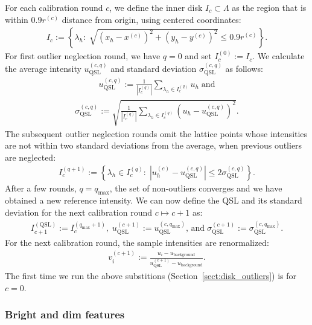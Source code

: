 \documentclass{aa}
\newcommand{\eqnl}[2]{\begin{eqnarray}\label{#1}#2\end{eqnarray}}
\newcommand{\s}[2]{{#1}_{\mathrm{#2}}}
\begin{document}
  For each calibration round $c$, we define the inner disk $I_c \subset \Lambda$ as the region that is within $0.9 r^{(c)}$ distance from origin, using centered coordinates:
  \eqnl{calib_inner_disk1}{
  I_c := \left\{ \lambda_h :\; \sqrt{\left( x_h - x^{(c)} \right)^2 + \left( y_h - y^{(c)} \right)^2} \le 0.9 r^{(c)} \right\} \text{.}
  }  
  For first outlier neglection round, we have $q=0$ and set $I_{c}^{(0)} := I_c$. We calculate the average intensity $\s{u}{QSL}^{(c,q)}$ and standard deviation $\s{\sigma}{QSL}^{(c,q)}$ as follows:
  \eqnl{calib_inner_disk2}{
  \s{u}{QSL}^{(c,q)} := \frac{1}{|I_{c}^{(q)}|} \sum \limits_{\lambda_h \in I_{c}^{(q)}} u_h \; \text{and}
  }
  \eqnl{calib_inner_disk3}{
  \s{\sigma}{QSL}^{(c,q)} := \sqrt{\frac{1}{|I_{c}^{(q)}|} \sum \limits_{\lambda_h \in I_{c}^{(q)}} \left( u_h - \s{u}{QSL}^{(c,q)} \right)^2} \text{.}
  }
  The subsequent outlier neglection rounds omit the lattice points whose intensities are not within two standard deviations from the average, when previous outliers are neglected:
  \eqnl{calib_inner_disk4}{
  I_c^{(q+1)} := \left\{ \lambda_h \in I_c^{(q)} :\; \left|u_h^{(c)} - \s{u}{QSL}^{(c,q)} \right| \le 2 \s{\sigma}{QSL}^{(c,q)} \right\} \text{.}
  }
  After a few rounds, $q = \s{q}{max}$, the set of non-outliers converges and we have obtained a new reference 
  intensity. We can now define the QSL and its standard deviation for the next calibration round $c \mapsto c+1$ as:
  \eqnl{calib_inner_disk5}{
  I_{c+1}^{(\mathrm{QSL})} := I_{c}^{(\s{q}{max}+1)},\; \s{u}{QSL}^{(c+1)} := \s{u}{QSL}^{(c,\s{q}{max})} \text{, and} \; \s{\sigma}{QSL}^{(c+1)} := \s{\sigma}{QSL}^{(c,\s{q}{max})} \text{.}
  }
  For the next calibration round, the sample intensities are renormalized:
  \eqnl{calib_inner_disk6}{
  v_i^{(c+1)} := \frac{u_i - \s{u}{background}}{\s{u}{QSL}^{(c+1)} - \s{u}{background}} \text{.}
  }
  The first time we run the above substitions (Section~\ref{sect:disk_outliers}) is for $c=0$.

  \subsubsection{Bright and dim features} \label{sect:bright_dim_features}
\end{document}
